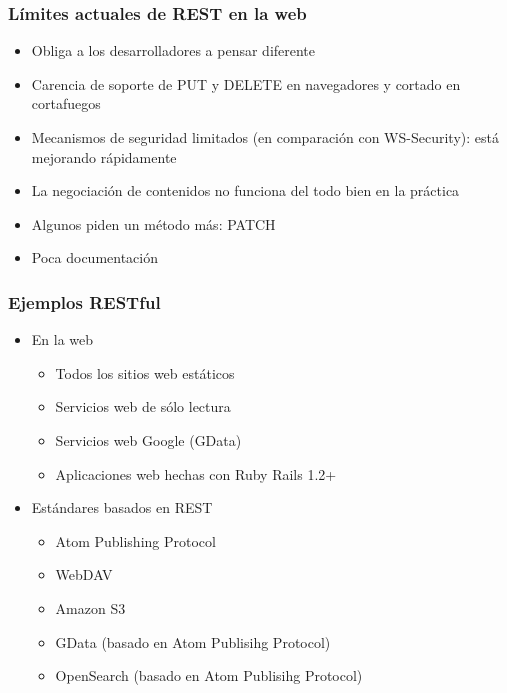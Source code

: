 \begin{frame}
\frametitle{Límites actuales de REST en la web}

\begin{itemize}
\item Obliga a los desarrolladores a pensar diferente
\item Carencia de soporte de PUT y DELETE en navegadores y cortado en cortafuegos
\item Mecanismos de seguridad limitados (en comparación con WS-Security): está mejorando rápidamente
\item La negociación de contenidos no funciona del todo bien en la práctica
\item Algunos piden un método más: PATCH
\item Poca documentación
\end{itemize}

\end{frame}

\begin{frame}
\frametitle{Ejemplos RESTful}

\begin{itemize}
\item En la web  
  \begin{itemize}
  \item Todos los sitios web estáticos
  \item Servicios web de sólo lectura
  \item Servicios web Google (GData)
  \item Aplicaciones web hechas con Ruby Rails 1.2+
  \end{itemize}
\item Estándares basados en REST
  \begin{itemize}
  \item Atom Publishing Protocol
  \item WebDAV
  \item Amazon S3
  \item GData (basado en Atom Publisihg Protocol)
  \item OpenSearch (basado en Atom Publisihg Protocol)
  \end{itemize}
\end{itemize}

\end{frame}

